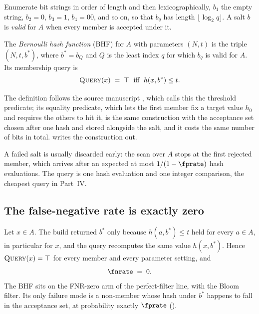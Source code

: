 Enumerate bit strings in order of length and then lexicographically,
$b_1$ the empty string, $b_2 = 0$, $b_3 = 1$, $b_4 = 00$, and so on, so that $b_q$ has length $\lfloor \log_2 q \rfloor$. A salt
$b$ is \emph{valid} for $A$ when every member is accepted under it.

\begin{definition}
\label{def:bhf}
The \emph{Bernoulli hash function} (BHF) for $A$ with parameters $(N,
t)$ is the triple $(N, t, b^{*})$, where $b^{*} = b_Q$ and $Q$ is the
least index $q$ for which $b_q$ is valid for $A$. Its membership query is
\[
  \textsc{Query}(x) \;=\; \top \;\text{ iff }\; h(x, b^{*}) \le t.
\]
\end{definition}

The definition follows the source manuscript
\parencite{towell-bernoulli-hash-function}, which calls this the
threshold predicate; its equality predicate, which lets the first member
fix a target value $h_0$ and requires the others to hit it, is the same
construction with the acceptance set chosen after one hash and stored
alongside the salt, and it costs the same number of bits in total.
 writes the construction out.

\begin{algorithm}[ht]
  \caption{BHF construction (salt search) and query}
  \label{alg:bhf-insert-query}

  \BlankLine
\end{algorithm}

A failed salt is usually discarded early: the scan over $A$ stops at the
first rejected member, which arrives after an expected at most $1/(1 -
\fprate)$ hash evaluations. The query is one hash evaluation and one
integer comparison, the cheapest query in Part~IV.

\subsection*{The false-negative rate is exactly zero}

Let $x \in A$. The build returned $b^{*}$ only because $h(a, b^{*}) \le t$
held for every $a \in A$, in particular for $x$, and the query
recomputes the same value $h(x, b^{*})$. Hence $\textsc{Query}(x) = \top$
for every member and every parameter setting, and
\[
  \fnrate \;=\; 0.
\]
The BHF sits on the FNR-zero arm of the perfect-filter line, with the
Bloom filter. Its only failure mode is a non-member whose hash under
$b^{*}$ happens to fall in the acceptance set, at probability exactly
$\fprate$ ().

